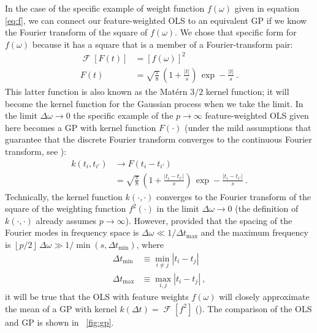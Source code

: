 \documentclass[12pt,letterpaper]{article}
\newcommand{\floor}[1]{\left\lfloor #1 \right\rfloor}
\DeclareMathOperator{\FT}{\mathscr{F}}
\begin{document}
In the case of the specific example of weight function $f(\omega)$ given in equation \eqref{eq:f}, we can connect our feature-weighted OLS to an equivalent GP if we know the Fourier transform of the square of $f(\omega)$. We chose that specific form for $f(\omega)$ because it has a square that is a member of a Fourier-transform pair:
\begin{align}
    \FT[F(t)] &= [f(\omega)]^2
    \\ \label{eq:F}
    F(t) &= \sqrt{\frac{\pi}{8}}\,\left(1 + \frac{|t|}{s}\right)\,\exp -\frac{|t|}{s}
    ~.
\end{align}
This latter function is also known as the Mat\'ern $3/2$ kernel function; it will become the kernel function for the Gaussian process when we take the limit.
In the limit $\Delta\omega\to 0$ the specific example of the $p\to\infty$ feature-weighted OLS given here becomes a GP with kernel function $F(\cdot)$ (under the mild assumptions that guarantee that the discrete Fourier transform converges to the continuous Fourier transform, see \citealt{ft}):
\begin{align}
    k(t_i,t_{i'}) &\to F(t_i-t_{i'})
    \\ \label{eq:k}
    &= \sqrt{\frac{\pi}{8}}\,\left(1 + \frac{|t_i - t_{i'}|}{s}\right)\,\exp -\frac{|t_i - t_{i'}|}{s}
    ~.
\end{align}
Technically, the kernel function $k(\cdot,\cdot)$ converges to the Fourier transform of the square of the weighting function $f^2(\cdot)$ in the limit $\Delta\omega\to 0$ (the definition of $k(\cdot,\cdot)$ already assumes $p\to \infty$).
However, provided that the spacing of the Fourier modes in frequency space is $\Delta\omega\ll 1 / \Delta t_{\max}$ and the maximum frequency is $\floor{p / 2}\,\Delta\omega \gg 1 / \min(s, \Delta t_{\min})$, where
\begin{align}
    \Delta t_{\min} &\equiv \min_{i\ne j}|t_i - t_j|
    \\
    \Delta t_{\max} &\equiv \max_{i,j}|t_i - t_j|
    ~,
\end{align}
it will be true that the OLS with feature weights $f(\omega)$ will closely approximate the mean of a GP with kernel $k(\Delta t) = \FT[f^2]$ (\citealt{ft}).
The comparison of the OLS and GP is shown in \figurename~\ref{fig:gp}.
\end{document}
